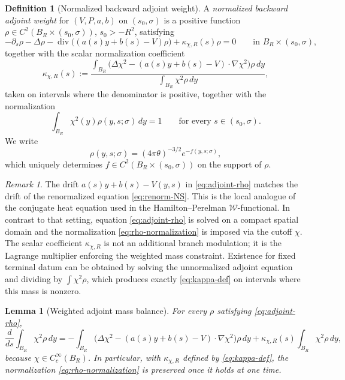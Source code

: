 \documentclass[11pt]{amsart}
\numberwithin{equation}{section}
\theoremstyle{plain}
\newtheorem{lemma}[theorem]{Lemma}
\theoremstyle{definition}
\newtheorem{definition}[theorem]{Definition}
\theoremstyle{remark}
\newtheorem{remark}[theorem]{Remark}
\newcommand{\diver}{\operatorname{div}}
\newcommand{\kappachi}{\kappa_{\chi,R}}
\begin{document}
\begin{definition}[Normalized backward adjoint weight]
\label{def:adjoint-weight}
A \emph{normalized backward adjoint weight} for \((V,P,a,b)\) on
\((s_0,\sigma)\) is a positive function
\(\rho\in C^2(B_R\times(s_0,\sigma))\), \(s_0>-R^2\), satisfying
\begin{equation}\label{eq:adjoint-rho}
	-\partial_s\rho-\Delta\rho-\diver\bigl((a(s)y+b(s)-V)\rho\bigr)
	+\kappachi(s)\rho=0
	\qquad\text{in }B_R\times(s_0,\sigma),
\end{equation}
together with the scalar normalization coefficient
\begin{equation}\label{eq:kappa-def}
	\kappachi(s)
	:=\frac{\displaystyle\int_{B_R}
	\bigl(\Delta\chi^2-(a(s)y+b(s)-V)\cdot\nabla\chi^2\bigr)\rho\,dy}
	{\displaystyle\int_{B_R}\chi^2\rho\,dy},
\end{equation}
	taken on intervals where the denominator is positive, together with the
	normalization
\begin{equation}\label{eq:rho-normalization}
	\int_{B_R}\chi^2(y)\rho(y,s;\sigma)\,dy=1
	\qquad\text{for every }s\in(s_0,\sigma).
\end{equation}
We write
\begin{equation}\label{eq:rho-f}
	\rho(y,s;\sigma)=(4\pi\theta)^{-3/2}e^{-f(y,s;\sigma)},
\end{equation}
which uniquely determines \(f\in C^2(B_R\times(s_0,\sigma))\) on the support
of \(\rho\).
\end{definition}

\begin{remark}
The drift \(a(s)y+b(s)-V(y,s)\) in \eqref{eq:adjoint-rho} matches the drift
of the renormalized equation \eqref{eq:renorm-NS}.  This is the local
analogue of the conjugate heat equation used in the Hamilton--Perelman
\(\mathcal W\)-functional.  In contrast to that setting, equation
\eqref{eq:adjoint-rho} is solved on a compact spatial domain and the
normalization \eqref{eq:rho-normalization} is imposed via the cutoff
\(\chi\).  The scalar coefficient \(\kappachi\) is not an additional branch
modulation; it is the Lagrange multiplier enforcing the weighted mass
constraint.  Existence for fixed terminal datum can be obtained by solving
the unnormalized adjoint equation and dividing by
\(\int\chi^2\rho\), which produces exactly \eqref{eq:kappa-def} on intervals
where this mass is nonzero.
\end{remark}

\begin{lemma}[Weighted adjoint mass balance]
\label{lem:adjoint-rho-conserves-norm}
For every \(\rho\) satisfying \eqref{eq:adjoint-rho},
\begin{equation}\label{eq:adjoint-rho-conserves-norm}
	\frac{d}{ds}\int_{B_R}\chi^2\rho\,dy
	=-\int_{B_R}\bigl(\Delta\chi^2-(a(s)y+b(s)-V)\cdot\nabla\chi^2\bigr)\rho\,dy
	+\kappachi(s)\int_{B_R}\chi^2\rho\,dy,
\end{equation}
because \(\chi\in C_c^\infty(B_R)\).  In particular, with \(\kappachi\)
defined by \eqref{eq:kappa-def}, the normalization
\eqref{eq:rho-normalization} is preserved once it holds at one time.
\end{lemma}
\end{document}
